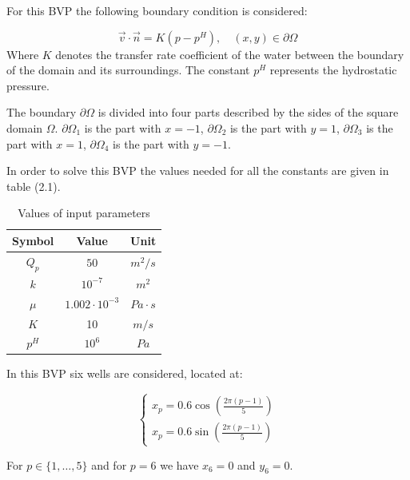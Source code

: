 \documentclass[a4paper]{report}
\begin{document}
\medskip

For this BVP the following boundary condition is considered: 

\begin{equation}
	\vec{v}\cdot\vec{n}=K(p-p^H), \quad (x,y) \in  \partial\Omega
\end{equation}
Where $K$ denotes the transfer rate coefficient of the water between the boundary of the domain and its surroundings. The constant $p^H$ represents the hydrostatic pressure. 

The boundary $\partial\Omega$ is divided into four parts described by the sides of the square domain $\Omega$. $\partial\Omega_1$ is the part with $x = -1$, $\partial\Omega_2$ is the part with $y = 1$, $\partial\Omega_3$ is the part with $x = 1$, $\partial\Omega_4$ is the part with $y = -1$.
\newpage

In order to solve this BVP the values needed for all the constants are given in table (2.1).


\begin{table}[h]
	\caption{Values of input parameters} %
	\centering %
	\begin{tabular}{c c c} %
		\hline\hline %
		Symbol & Value & Unit\\ [0.5ex] %
		\hline %
		$Q_p$ & $50$ & $m^2/s$ \\ %
		$k$ & $10^{-7}$ & $m^2$ \\
		$\mu$ & $1.002\cdot 10^{-3}$ & $Pa\cdot s$ \\
		$K$ & 10 & $m/s$ \\
		$p^H$ & $10^6$ & $Pa$ \\ [1ex] %
		\hline %
	\end{tabular}
	\label{table:nonlin} %
\end{table}
\bigskip

In this BVP six wells are considered, located at:


\begin{equation}
	\begin{cases} 
		x_p=0.6\cos(\frac{2\pi (p-1)}{5}) \\ x_p=0.6\sin(\frac{2\pi (p-1)}{5})
	\end{cases} 
\end{equation}

For $ p \in \{1, \dots ,5\}$ and for $p = 6$ we have $ x_6 = 0 $ and $ y_6 = 0 $.
\end{document}
